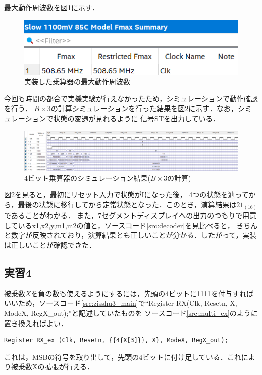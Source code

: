\documentclass{jlreq}
\numberwithin{equation}{section}
\begin{document}
最大動作周波数を図\ref{fig:fmax_multi}に示す．
\begin{figure}[H]
  \centering
  \includegraphics{assets/multi_fmax.png}
  \caption{実装した乗算器の最大動作周波数}
  \label{fig:fmax_multi}
\end{figure}


今回も時間の都合で実機実験が行えなかったため，シミュレーションで動作確認を行う．
$B \times 3$の計算シミュレーションを行った結果を図\ref{fig:result_multi_XB_Y3}に示す．なお，シミュレーションで状態の変遷が見れるように
信号STを出力している．
\begin{figure}[H]
  \centering
  \includegraphics[width=\textwidth]{assets/multi_XB_Y3.png}
  \caption{4ビット乗算器のシミュレーション結果($B \times 3$の計算)}
  \label{fig:result_multi_XB_Y3}
\end{figure}
図\ref{fig:result_multi_XB_Y3}を見ると，最初にリセット入力で状態がIになった後，
4つの状態を辿ってから，最後の状態に移行してから定常状態となった．このとき，演算結果は$21_{(16)}$であることがわかる．
また，7セグメントディスプレイへの出力のつもりで用意しているx1,x2,y,m1,m2の値と，ソースコード\ref{src:decoder}を見比べると，
きちんと数字が反映されており，演算結果とも正しいことが分かる．したがって，実装は正しいことが確認できた．

\subsection{実習4}
被乗数$X$を負の数も使えるようにするには，先頭の4ビットに1111を付与すればいいため，ソースコード\ref{src:zisshu3_main}で``Register RX(Clk, Resetn, X, ModeX, RegX\_out);''と記述していたものを
ソースコード\ref{src:multi_ex}のように置き換えればよい．
\begin{lstlisting}[caption={被乗数Xを負の数も使えるように拡張したもの}, label={src:multi_ex}]
  Register RX_ex (Clk, Resetn, {{4{X[3]}}, X}, ModeX, RegX_out);
\end{lstlisting}
これは，MSBの符号を取り出して，先頭の4ビットに付け足している．これにより被乗数Xの拡張が行える．
\end{document}
